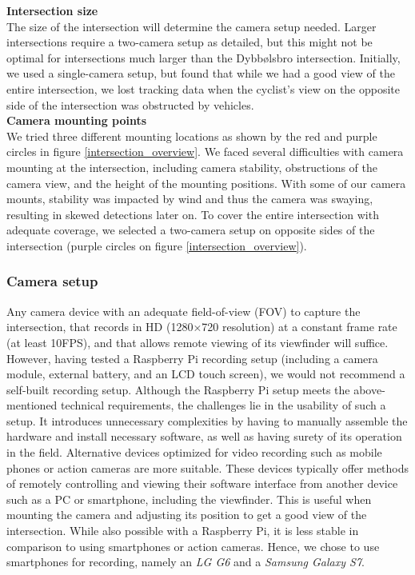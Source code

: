 \textbf{Intersection size} \\
The size of the intersection will determine the camera setup needed. Larger intersections require a two-camera setup as detailed, 
but this might not be optimal for intersections much larger than the Dybbølsbro intersection. 
Initially, we used a single-camera setup, but found that while we had a good view of the entire intersection, 
we lost tracking data when the cyclist's view on the opposite side of the intersection was obstructed by vehicles.
\ \\

\textbf{Camera mounting points} \\
We tried three different mounting locations as shown by the red and purple circles in figure \ref{intersection_overview}. 
We faced several difficulties with camera mounting at the intersection, including camera stability, 
obstructions of the camera view, and the height of the mounting positions. 
With some of our camera mounts, stability was impacted by wind and thus the camera was swaying, resulting in skewed detections later on.
To cover the entire intersection with adequate coverage, we selected a two-camera setup on opposite sides of the intersection 
(purple circles on figure \ref{intersection_overview}).

\subsubsection{Camera setup}
Any camera device with an adequate field-of-view (FOV) to capture the intersection, that records in HD (1280×720 resolution) at a constant 
frame rate (at least 10FPS), and that allows remote viewing of its viewfinder will suffice. 
However, having tested a Raspberry Pi recording setup (including a camera module, external battery, and an LCD touch screen), 
we would not recommend a self-built recording setup. Although the Raspberry Pi setup meets the above-mentioned technical requirements, 
the challenges lie in the usability of such a setup. 
It introduces unnecessary complexities by having to manually assemble the hardware and install necessary software, as well as 
having surety of its operation in the field.
Alternative devices optimized for video recording such as mobile phones or action cameras are more suitable.
These devices typically offer methods of remotely controlling and viewing their software interface from 
another device such as a PC or smartphone, including the viewfinder. 
This is useful when mounting the camera and adjusting its position to get a good view of the intersection. 
While also possible with a Raspberry Pi, it is less stable in comparison to using smartphones or action cameras.
Hence, we chose to use smartphones for recording, namely an \textit{LG G6} and a \textit{Samsung Galaxy S7}.


